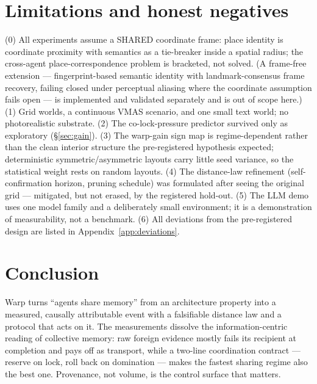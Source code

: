 \documentclass{article}
\begin{document}
\section{Limitations and honest negatives}
\label{sec:limits}

(0) All experiments assume a SHARED coordinate frame: place identity
is coordinate proximity with semantics as a tie-breaker inside a
spatial radius; the cross-agent place-correspondence problem is
bracketed, not solved. (A frame-free extension --- fingerprint-based
semantic identity with landmark-consensus frame recovery, failing
closed under perceptual aliasing where the coordinate assumption fails
open --- is implemented and validated separately and is out of scope
here.) (1) Grid worlds, a continuous VMAS scenario, and one small text
world; no photorealistic substrate. (2) The
co-lock-pressure predictor survived only as exploratory
(\S\ref{sec:gain}). (3) The warp-gain sign map is regime-dependent
rather than the clean interior structure the pre-registered
hypothesis expected; deterministic symmetric/asymmetric layouts carry
little seed variance, so the statistical weight rests on random
layouts. (4) The distance-law refinement (self-confirmation horizon,
pruning schedule) was formulated after seeing the original grid ---
mitigated, but not erased, by the registered hold-out. (5) The LLM
demo uses one model family and a deliberately small environment; it is
a demonstration of measurability, not a benchmark. (6) All deviations
from the pre-registered design are listed in
Appendix~\ref{app:deviations}.

\section{Conclusion}

Warp turns ``agents share memory'' from an architecture property into
a measured, causally attributable event with a falsifiable distance
law and a protocol that acts on it. The measurements dissolve the
information-centric reading of collective memory: raw foreign evidence
mostly fails its recipient at completion and pays off as transport,
while a two-line coordination contract --- reserve on lock, roll back
on domination --- makes the fastest sharing regime also the best one.
Provenance, not volume, is the control surface that matters.

\appendix
\end{document}
